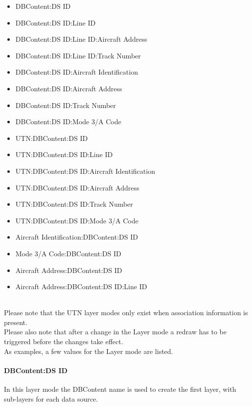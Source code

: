 \begin{itemize}
\item DBContent:DS ID
\item DBContent:DS ID:Line ID
\item DBContent:DS ID:Line ID:Aircraft Address
\item DBContent:DS ID:Line ID:Track Number
\item DBContent:DS ID:Aircraft Identification
\item DBContent:DS ID:Aircraft Address
\item DBContent:DS ID:Track Number
\item DBContent:DS ID:Mode 3/A Code
\item UTN:DBContent:DS ID
\item UTN:DBContent:DS ID:Line ID
\item UTN:DBContent:DS ID:Aircraft Identification
\item UTN:DBContent:DS ID:Aircraft Address
\item UTN:DBContent:DS ID:Track Number
\item UTN:DBContent:DS ID:Mode 3/A Code
\item Aircraft Identification:DBContent:DS ID
\item Mode 3/A Code:DBContent:DS ID
\item Aircraft Address:DBContent:DS ID
\item Aircraft Address:DBContent:DS ID:Line ID
\end{itemize}
\  \\

Please note that the UTN layer modes only exist when association information is present. \\

Please also note that after a change in the Layer mode a redraw has to be triggered before the changes take effect. \\

As examples, a few values for the Layer mode are listed. \\

\paragraph{DBContent:DS ID}

In this layer mode the DBContent name is used to create the first layer, with sub-layers for each data source.

